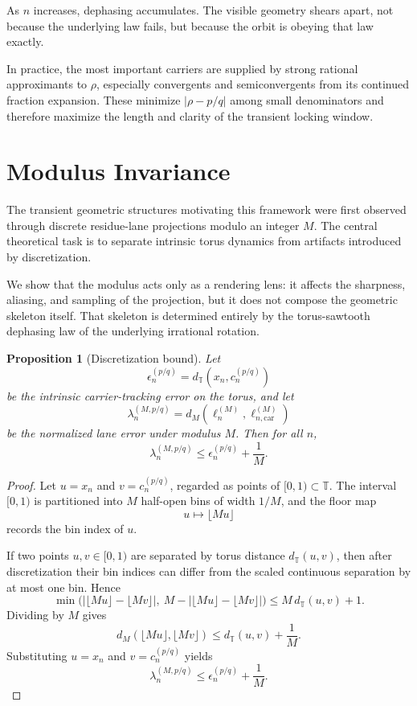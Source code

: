 \documentclass[11pt]{article}
\newtheorem{proposition}[theorem]{Proposition}
\newcommand{\T}{\mathbb{T}}
\begin{document}
As $n$ increases, dephasing accumulates. The visible geometry shears apart, not because the underlying law fails, but because the orbit is obeying that law exactly.

In practice, the most important carriers are supplied by strong rational approximants to $\rho$, especially convergents and semiconvergents from its continued fraction expansion. These minimize $|\rho-p/q|$ among small denominators and therefore maximize the length and clarity of the transient locking window.

\section{Modulus Invariance}

The transient geometric structures motivating this framework were first observed through discrete residue-lane projections modulo an integer $M$. The central theoretical task is to separate intrinsic torus dynamics from artifacts introduced by discretization.

We show that the modulus acts only as a rendering lens: it affects the sharpness, aliasing, and sampling of the projection, but it does not compose the geometric skeleton itself. That skeleton is determined entirely by the torus-sawtooth dephasing law of the underlying irrational rotation.

\begin{proposition}[Discretization bound]
Let
\[
\epsilon_n^{(p/q)}
=
d_{\T}\!\left(x_n,c_n^{(p/q)}\right)
\]
be the intrinsic carrier-tracking error on the torus, and let
\[
\lambda_n^{(M,p/q)}
=
d_M\!\left(\ell_n^{(M)},\ell_{n,\mathrm{car}}^{(M)}\right)
\]
be the normalized lane error under modulus $M$. Then for all $n$,
\begin{equation}
\lambda_n^{(M,p/q)} \le \epsilon_n^{(p/q)} + \frac{1}{M}.
\end{equation}
\end{proposition}

\begin{proof}
Let $u=x_n$ and $v=c_n^{(p/q)}$, regarded as points of $[0,1)\subset\T$. The interval $[0,1)$ is partitioned into $M$ half-open bins of width $1/M$, and the floor map
\[
u \mapsto \lfloor Mu\rfloor
\]
records the bin index of $u$.

If two points $u,v\in[0,1)$ are separated by torus distance $d_{\T}(u,v)$, then after discretization their bin indices can differ from the scaled continuous separation by at most one bin. Hence
\[
\min\bigl(|\lfloor Mu\rfloor-\lfloor Mv\rfloor|,\ M-|\lfloor Mu\rfloor-\lfloor Mv\rfloor|\bigr)
\le
M\,d_{\T}(u,v)+1.
\]
Dividing by $M$ gives
\[
d_M\!\left(\lfloor Mu\rfloor,\lfloor Mv\rfloor\right)
\le
d_{\T}(u,v)+\frac{1}{M}.
\]
Substituting $u=x_n$ and $v=c_n^{(p/q)}$ yields
\[
\lambda_n^{(M,p/q)} \le \epsilon_n^{(p/q)}+\frac{1}{M}.
\]
\end{proof}
\end{document}
